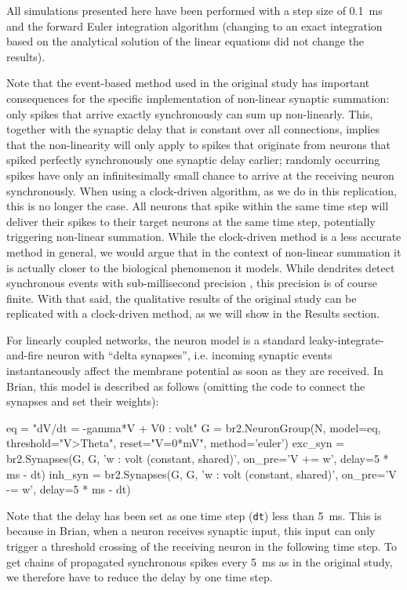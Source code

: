 \documentclass[10pt,a4paper,onecolumn]{article}
\begin{document}
All simulations presented here have been performed with a step size of \SI{0.1}{\milli\second} and the forward Euler integration algorithm (changing to an exact integration based on the analytical solution of the linear equations did not change the results).

Note that the event-based method used in the original study has important consequences for the specific implementation of non-linear synaptic summation: only spikes that arrive exactly synchronously can sum up non-linearly. This, together with the synaptic delay that is constant over all connections, implies that the non-linearity will only apply to spikes that originate from neurons that spiked perfectly synchronously one synaptic delay earlier; randomly occurring spikes have only an infinitesimally small chance to arrive at the receiving neuron synchronously. When using a clock-driven algorithm, as we do in this replication, this is no longer the case. All neurons that spike within the same time step will deliver their spikes to their target neurons at the same time step, potentially triggering non-linear summation. While the clock-driven method is a less accurate method in general, we would argue that in the context of non-linear summation it is actually closer to the biological phenomenon it models. While dendrites detect synchronous events with sub-millisecond precision \cite{Softky1994}, this precision is of course finite. With that said, the qualitative results of the original study can be replicated with a clock-driven method, as we will show in the Results section.

For linearly coupled networks, the neuron model is a standard leaky-integrate-and-fire neuron with ``delta synapses'', i.e. incoming synaptic events instantaneously affect the membrane potential as soon as they are received. In Brian, this model is described as follows (omitting the code to connect the synapses and set their weights):
\begin{code}
eq = "dV/dt = -gamma*V + V0 : volt"
G = br2.NeuronGroup(N, model=eq, threshold="V>Theta",
                    reset="V=0*mV", method='euler')
exc_syn = br2.Synapses(G, G, 'w : volt (constant, shared)',
                       on_pre='V += w', delay=5 * ms - dt)
inh_syn = br2.Synapses(G, G, 'w : volt (constant, shared)',
                       on_pre='V -= w', delay=5 * ms - dt)
\end{code}
Note that the delay has been set as one time step (\verb|dt|) less than \SI{5}{\milli\second}. This is because in Brian, when a neuron receives synaptic input, this input can only trigger a threshold crossing of the receiving neuron in the following time step. To get chains of propagated synchronous spikes every \SI{5}{\milli\second} as in the original study, we therefore have to reduce the delay by one time step.
\end{document}

